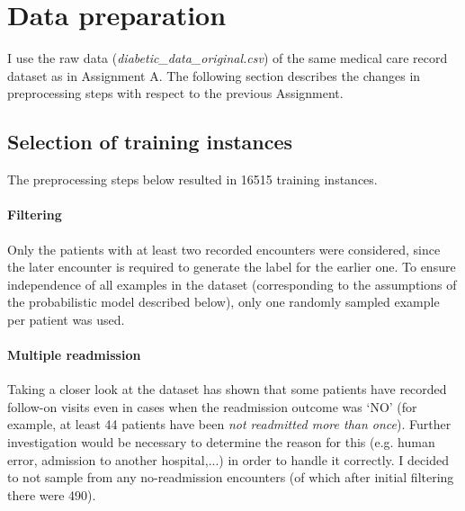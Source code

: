 \documentclass[10pt, twocolumn]{article}
\begin{document}
\thispagestyle{first}
\pagestyle{plain}


\section{Data preparation}

I use the raw data (\textit{diabetic\_data\_original.csv}) of the same medical care record dataset \cite{strack2014dataset} as in Assignment A. The following section describes the changes in preprocessing steps with respect to the previous Assignment.

\subsection{Selection of training instances}
The preprocessing steps below resulted in 16515 training instances.

\paragraph{Filtering}
Only the patients with at least two recorded encounters were considered, since the later encounter is required to generate the label for the earlier one. To ensure independence of all examples in the dataset (corresponding to the assumptions of the probabilistic model described below), only one randomly sampled example per patient was used.

\paragraph{Multiple readmission} Taking a closer look at the dataset has shown that some patients have recorded follow-on visits even in cases when the readmission outcome was `NO' (for example, at least 44 patients have been \textit{not readmitted more than once}). Further investigation would be necessary to determine the reason for this (e.g. human error, admission to another hospital,...) in order to handle it correctly. I decided to not sample from any no-readmission encounters (of which after initial filtering there were 490).
\end{document}
